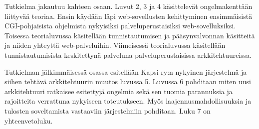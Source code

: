 Tutkielma jakautuu kahteen osaan. Luvut 2, 3 ja 4 käsittelevät ongelmakenttään liittyvää teoriaa. Ensin käydään läpi web-sovellusten kehittyminen ensimmäisistä CGI-pohjaisista ohjelmista nykyisiksi palveluperustaisiksi web-sovelluksiksi. Toisessa teorialuvussa käsitellään tunnistautumisen ja pääsynvalvonnan käsitteitä ja niiden yhteyttä web-palveluihin. Viimeisessä teorialuvussa käsitellään tunnistautumisista keskitettynä palveluna palveluperustaisissa arkkitehtuureissa.

Tutkielman jälkimmäisessä osassa esitellään Kapsi ry:n nykyinen järjestelmä ja siihen tehtävä arkkitehtuurin muutos luvussa 5. Luvussa 6 pohditaan miten uusi arkkitehtuuri ratkaisee esitettyjä ongelmia sekä sen tuomia parannuksia ja rajoitteita verrattuna nykyiseen toteutukseen. Myös laajennusmahdollisuuksia ja tulosten soveltamista vastaaviin järjestelmiin pohditaan. Luku 7 on yhteenvetoluku.